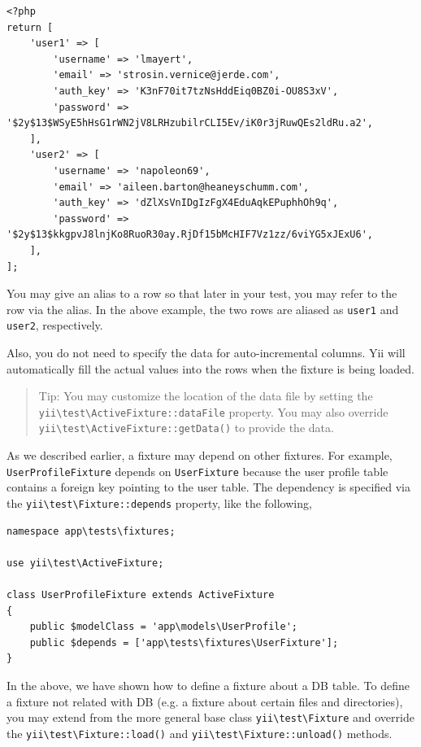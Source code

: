 \lstset{language=php}\begin{lstlisting}
<?php
return [
    'user1' => [
        'username' => 'lmayert',
        'email' => 'strosin.vernice@jerde.com',
        'auth_key' => 'K3nF70it7tzNsHddEiq0BZ0i-OU8S3xV',
        'password' => '$2y$13$WSyE5hHsG1rWN2jV8LRHzubilrCLI5Ev/iK0r3jRuwQEs2ldRu.a2',
    ],
    'user2' => [
        'username' => 'napoleon69',
        'email' => 'aileen.barton@heaneyschumm.com',
        'auth_key' => 'dZlXsVnIDgIzFgX4EduAqkEPuphhOh9q',
        'password' => '$2y$13$kkgpvJ8lnjKo8RuoR30ay.RjDf15bMcHIF7Vz1zz/6viYG5xJExU6',
    ],
];
\end{lstlisting}
You may give an alias to a row so that later in your test, you may refer to the row via the alias. In the above example,
the two rows are aliased as \lstinline|user1| and \lstinline|user2|, respectively.

Also, you do not need to specify the data for auto-incremental columns. Yii will automatically fill the actual
values into the rows when the fixture is being loaded.

\begin{quote}Tip: You may customize the location of the data file by setting the \texttt{yii{\allowbreak{}\textbackslash}test{\allowbreak{}\textbackslash}ActiveFixture\allowbreak{}::\allowbreak{}dataFile} property.
You may also override \texttt{yii{\allowbreak{}\textbackslash}test{\allowbreak{}\textbackslash}ActiveFixture\allowbreak{}::\allowbreak{}getData()} to provide the data.

\end{quote}
As we described earlier, a fixture may depend on other fixtures. For example, \lstinline|UserProfileFixture| depends on \lstinline|UserFixture|
because the user profile table contains a foreign key pointing to the user table.
The dependency is specified via the \texttt{yii{\allowbreak{}\textbackslash}test{\allowbreak{}\textbackslash}Fixture\allowbreak{}::\allowbreak{}depends} property, like the following,

\lstset{language=php}\begin{lstlisting}
namespace app\tests\fixtures;

use yii\test\ActiveFixture;

class UserProfileFixture extends ActiveFixture
{
    public $modelClass = 'app\models\UserProfile';
    public $depends = ['app\tests\fixtures\UserFixture'];
}
\end{lstlisting}
In the above, we have shown how to define a fixture about a DB table. To define a fixture not related with DB
(e.g. a fixture about certain files and directories), you may extend from the more general base class
\texttt{yii{\allowbreak{}\textbackslash}test{\allowbreak{}\textbackslash}Fixture} and override the \texttt{yii{\allowbreak{}\textbackslash}test{\allowbreak{}\textbackslash}Fixture\allowbreak{}::\allowbreak{}load()} and \texttt{yii{\allowbreak{}\textbackslash}test{\allowbreak{}\textbackslash}Fixture\allowbreak{}::\allowbreak{}unload()} methods.

